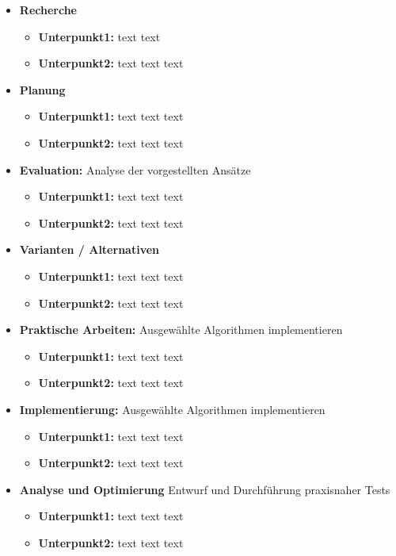 \documentclass[lang=ngerman,inputenc=utf8,fontsize=10pt]{ldvarticle}
\begin{document}
\begin{itemize}
	\item \textbf{Recherche}
		\begin{itemize}
			\item \textbf{Unterpunkt1:}  text text
			\item \textbf{Unterpunkt2:} text text text
		\end{itemize}
	\item \textbf{Planung}
		\begin{itemize}
			\item \textbf{Unterpunkt1:} text text text
			\item \textbf{Unterpunkt2:} text text text
		\end{itemize}
	\item \textbf{Evaluation:} Analyse der vorgestellten Ansätze
		\begin{itemize}
			\item \textbf{Unterpunkt1:} text text text
			\item \textbf{Unterpunkt2:} text text text
		\end{itemize}
	\item \textbf{Varianten / Alternativen}  
		\begin{itemize}
			\item \textbf{Unterpunkt1:} text text text
			\item \textbf{Unterpunkt2:} text text text
		\end{itemize}
	\item \textbf{Praktische Arbeiten:} Ausgewählte Algorithmen implementieren 
		\begin{itemize}
			\item \textbf{Unterpunkt1:} text text text
			\item \textbf{Unterpunkt2:} text text text 
		\end{itemize}
	\item \textbf{Implementierung:} Ausgewählte Algorithmen implementieren 
		\begin{itemize}
			\item \textbf{Unterpunkt1:} text text text
			\item \textbf{Unterpunkt2:} text text text 
		\end{itemize}
	\item \textbf{Analyse und Optimierung} Entwurf und Durchführung praxisnaher Tests
		\begin{itemize}
			\item \textbf{Unterpunkt1:} text text text
			\item \textbf{Unterpunkt2:} text text text

\end{itemize}
\end{itemize}
\end{document}
